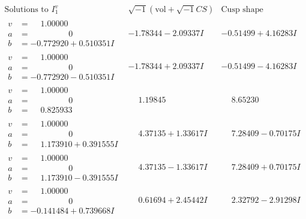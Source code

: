 \documentclass[1p]{elsarticle_modified}
\theoremstyle{definition}
\newcommand{\I}{\sqrt{-1}}
\begin{document}
$$\begin{array}{c|c|c}  
\text{Solutions to }I^v_{1}& \I (\text{vol} + \sqrt{-1}CS) & \text{Cusp shape}\\
 \hline 
\begin{aligned}
v &= \phantom{-}1.00000\phantom{ +0.000000I} \\
a &= \phantom{-0.000000 } 0 \\
b &= -0.772920 + 0.510351 I\end{aligned}
 & -1.78344 - 2.09337 I & -0.51499 + 4.16283 I \\ \hline\begin{aligned}
v &= \phantom{-}1.00000\phantom{ +0.000000I} \\
a &= \phantom{-0.000000 } 0 \\
b &= -0.772920 - 0.510351 I\end{aligned}
 & -1.78344 + 2.09337 I & -0.51499 - 4.16283 I \\ \hline\begin{aligned}
v &= \phantom{-}1.00000\phantom{ +0.000000I} \\
a &= \phantom{-0.000000 } 0 \\
b &= \phantom{-}0.825933\phantom{ +0.000000I}\end{aligned}
 & \phantom{-}1.19845\phantom{ +0.000000I} & \phantom{-}8.65230\phantom{ +0.000000I} \\ \hline\begin{aligned}
v &= \phantom{-}1.00000\phantom{ +0.000000I} \\
a &= \phantom{-0.000000 } 0 \\
b &= \phantom{-}1.173910 + 0.391555 I\end{aligned}
 & \phantom{-}4.37135 + 1.33617 I & \phantom{-}7.28409 - 0.70175 I \\ \hline\begin{aligned}
v &= \phantom{-}1.00000\phantom{ +0.000000I} \\
a &= \phantom{-0.000000 } 0 \\
b &= \phantom{-}1.173910 - 0.391555 I\end{aligned}
 & \phantom{-}4.37135 - 1.33617 I & \phantom{-}7.28409 + 0.70175 I \\ \hline\begin{aligned}
v &= \phantom{-}1.00000\phantom{ +0.000000I} \\
a &= \phantom{-0.000000 } 0 \\
b &= -0.141484 + 0.739668 I\end{aligned}
 & \phantom{-}0.61694 + 2.45442 I & \phantom{-}2.32792 - 2.91298 I \\ \hline\begin{aligned}

\end{aligned}
\end{array}$$
\end{document}
